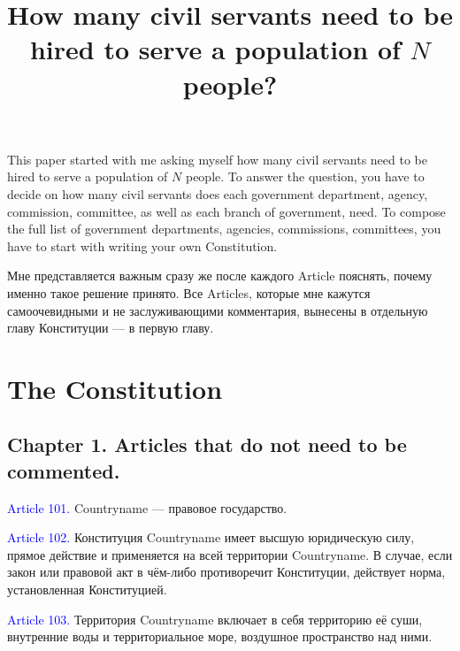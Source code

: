 \documentclass[11pt]{article}
\theoremstyle{remark}
\theoremstyle{definition}
\begin{document}
\baselineskip14pt
\bigskip




\title{How many civil servants need to be hired to serve a population of $N$ people?}




\maketitle





This paper started with me asking myself how many civil servants need to be hired to serve a population of $N$ people. To answer the question, you have to decide on how many civil servants does each government department, agency, commission, committee, as well as each branch of government, need. To compose the full list of government departments, agencies, commissions, committees, you have to start with writing your own Constitution.


Мне представляется важным сразу же после каждого Article пояснять, почему именно такое решение принято. Все Articles, которые мне кажутся самоочевидными и не заслуживающими комментария, вынесены в отдельную главу Конституции --- в первую главу.





\section{The Constitution}




\subsection*{Chapter 1. Articles that do not need to be commented.}


\textcolor{blue}{Article 101.} Countryname --- правовое государство.

\textcolor{blue}{Article 102.} Конституция Countryname имеет высшую юридическую силу, прямое действие и применяется на всей территории Countryname. В случае, если закон или правовой акт в чём-либо противоречит Конституции, действует норма, установленная Конституцией.


\textcolor{blue}{Article 103.} Территория Countryname включает в себя территорию её суши, внутренние воды и территориальное море, воздушное пространство над ними.
\end{document}
